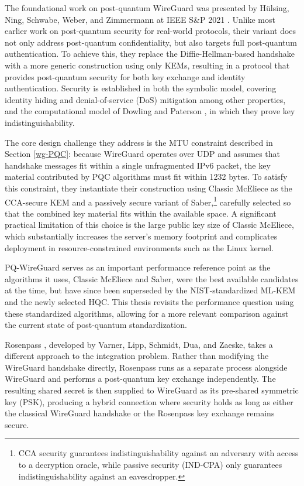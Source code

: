 
The foundational work on post-quantum WireGuard was presented by Hülsing, Ning, Schwabe, Weber, and Zimmermann at IEEE S\&P 2021 \cite{pqwg}. Unlike most earlier work on post-quantum security for real-world protocols, their variant does not only address post-quantum confidentiality, but also targets full post-quantum authentication. To achieve this, they replace the Diffie-Hellman-based handshake with a more generic construction using only KEMs, resulting in a protocol that provides post-quantum security for both key exchange and identity authentication. Security is established in both the symbolic model, covering identity hiding and denial-of-service (DoS) mitigation among other properties, and the computational model of Dowling and Paterson \cite{dowling2018wireguard}, in which they prove key indistinguishability.

The core design challenge they address is the MTU constraint described in Section \ref{wg-PQC}: because WireGuard operates over UDP and assumes that handshake messages fit within a single unfragmented IPv6 packet, the key material contributed by PQC algorithms must fit within 1232 bytes. To satisfy this constraint, they instantiate their construction using Classic McEliece as the CCA-secure KEM and a passively secure variant of Saber,\footnote{CCA security guarantees indistinguishability against an adversary with access to a decryption oracle, while passive security (IND-CPA) only guarantees indistinguishability against an eavesdropper.} carefully selected so that the combined key material fits within the available space. A significant practical limitation of this choice is the large public key size of Classic McEliece, which substantially increases the server's memory footprint and complicates deployment in resource-constrained environments such as the Linux kernel.

PQ-WireGuard serves as an important performance reference point as the algorithms it uses, Classic McEliece and Saber, were the best available candidates at the time, but have since been superseded by the NIST-standardized ML-KEM and the newly selected HQC. This thesis revisits the performance question using these standardized algorithms, allowing for a more relevant comparison against the current state of post-quantum standardization.

Rosenpass \cite{rosenpass}, developed by Varner, Lipp, Schmidt, Dua, and Zaeske, takes a different approach to the integration problem. Rather than modifying the WireGuard handshake directly, Rosenpass runs as a separate process alongside WireGuard and performs a post-quantum key exchange independently. The resulting shared secret is then supplied to WireGuard as its pre-shared symmetric key (PSK), producing a hybrid connection where security holds as long as either the classical WireGuard handshake or the Rosenpass key exchange remains secure.

